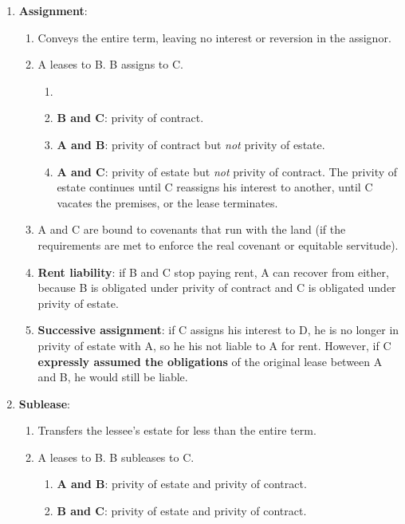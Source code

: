 \begin{enumerate}
    \item \textbf{Assignment}:
    \begin{enumerate}
        \item Conveys the entire term, leaving no interest or reversion in the 
        assignor.
        \item A leases to B. B assigns to C.
        \begin{enumerate}
            \item \item \textbf{B and C}: privity of contract.
            \item \textbf{A and B}: privity of contract but \emph{not} privity 
            of estate.
            \item \textbf{A and C}: privity of estate but \emph{not} privity 
            of contract. The privity of estate continues until C reassigns his 
            interest to another, until C vacates the premises, or the lease 
            terminates.
        \end{enumerate}
        \item A and C are bound to covenants that run with the land (if the 
        requirements are met to enforce the real covenant or equitable 
        servitude).
        \item \textbf{Rent liability}: if B and C stop paying rent, A can 
        recover from either, because B is obligated under privity of contract 
        and C is obligated under privity of estate.
        \item \textbf{Successive assignment}: if C assigns his interest to D, 
        he is no longer in privity of estate with A, so he his not liable to A 
        for rent. However, if C \textbf{expressly assumed the obligations} of 
        the original lease between A and B, he would still be liable.
    \end{enumerate}
    \item \textbf{Sublease}: 
    \begin{enumerate}
        \item Transfers the lessee's estate for less than the entire term.
        \item A leases to B. B subleases to C.
        \begin{enumerate}
            \item \textbf{A and B}: privity of estate and privity of contract.
            \item \textbf{B and C}: privity of estate and privity of contract.

\end{enumerate}
\end{enumerate}
\end{enumerate}
